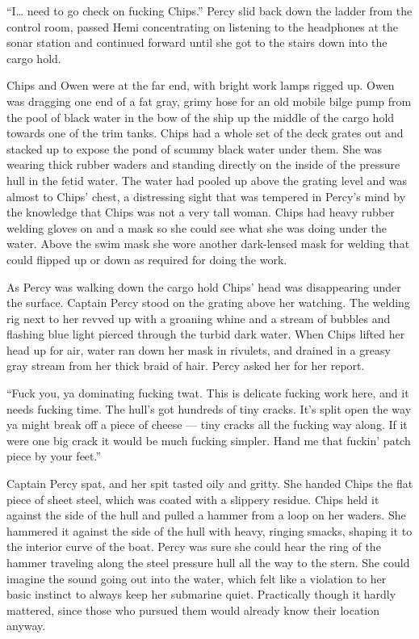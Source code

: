 \documentclass[]{article}
\begin{document}
``I\ldots{} need to go check on fucking Chips.'' Percy slid back down
the ladder from the control room, passed Hemi concentrating on listening
to the headphones at the sonar station and continued forward until she
got to the stairs down into the cargo hold.

Chips and Owen were at the far end, with bright work lamps rigged up.
Owen was dragging one end of a fat gray, grimy hose for an old mobile
bilge pump from the pool of black water in the bow of the ship up the
middle of the cargo hold towards one of the trim tanks. Chips had a
whole set of the deck grates out and stacked up to expose the pond of
scummy black water under them. She was wearing thick rubber waders and
standing directly on the inside of the pressure hull in the fetid water.
The water had pooled up above the grating level and was almost to Chips'
chest, a distressing sight that was tempered in Percy's mind by the
knowledge that Chips was not a very tall woman. Chips had heavy rubber
welding gloves on and a mask so she could see what she was doing under
the water. Above the swim mask she wore another dark-lensed mask for
welding that could flipped up or down as required for doing the work.

As Percy was walking down the cargo hold Chips' head was disappearing
under the surface. Captain Percy stood on the grating above her
watching. The welding rig next to her revved up with a groaning whine
and a stream of bubbles and flashing blue light pierced through the
turbid dark water. When Chips lifted her head up for air, water ran down
her mask in rivulets, and drained in a greasy gray stream from her thick
braid of hair. Percy asked her for her report.

``Fuck you, ya dominating fucking twat. This is delicate fucking work
here, and it needs fucking time. The hull's got hundreds of tiny cracks.
It's split open the way ya might break off a piece of cheese --- tiny
cracks all the fucking way along. If it were one big crack it would be
much fucking simpler. Hand me that fuckin' patch piece by your feet.''

Captain Percy spat, and her spit tasted oily and gritty. She handed
Chips the flat piece of sheet steel, which was coated with a slippery
residue. Chips held it against the side of the hull and pulled a hammer
from a loop on her waders. She hammered it against the side of the hull
with heavy, ringing smacks, shaping it to the interior curve of the
boat. Percy was sure she could hear the ring of the hammer traveling
along the steel pressure hull all the way to the stern. She could
imagine the sound going out into the water, which felt like a violation
to her basic instinct to always keep her submarine quiet. Practically
though it hardly mattered, since those who pursued them would already
know their location anyway.
\end{document}

